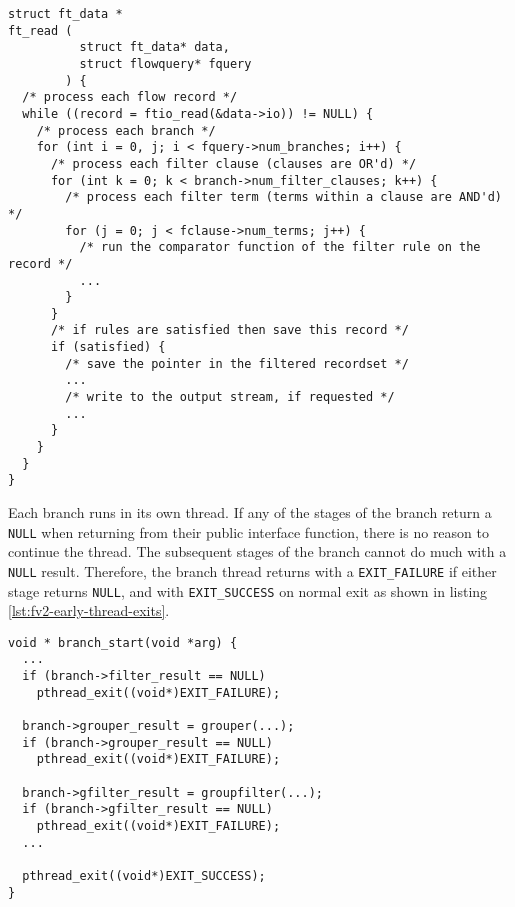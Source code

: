\begin{lstlisting}
struct ft_data *
ft_read (
          struct ft_data* data,
          struct flowquery* fquery
        ) {
  /* process each flow record */
  while ((record = ftio_read(&data->io)) != NULL) {
    /* process each branch */
    for (int i = 0, j; i < fquery->num_branches; i++) {
      /* process each filter clause (clauses are OR'd) */
      for (int k = 0; k < branch->num_filter_clauses; k++) {
        /* process each filter term (terms within a clause are AND'd) */
        for (j = 0; j < fclause->num_terms; j++) {
          /* run the comparator function of the filter rule on the record */
          ...
        }
      }
      /* if rules are satisfied then save this record */
      if (satisfied) {
        /* save the pointer in the filtered recordset */
        ...
        /* write to the output stream, if requested */
        ...
      }
    }
  }
}
\end{lstlisting}




Each branch runs in its own thread. If any of the stages of the branch return
a \texttt{NULL} when returning from their public interface function, there is
no  reason to continue the thread. The
subsequent stages of the branch cannot do much with a \texttt{NULL} result.
Therefore, the branch thread returns with a \texttt{EXIT\_FAILURE} if either
stage returns \texttt{NULL}, and with \texttt{EXIT\_SUCCESS} on normal exit as
shown in listing \ref{lst:fv2-early-thread-exits}.

\begin{lstlisting}
void * branch_start(void *arg) {
  ...
  if (branch->filter_result == NULL)
    pthread_exit((void*)EXIT_FAILURE);

  branch->grouper_result = grouper(...);
  if (branch->grouper_result == NULL)
    pthread_exit((void*)EXIT_FAILURE);

  branch->gfilter_result = groupfilter(...);
  if (branch->gfilter_result == NULL)
    pthread_exit((void*)EXIT_FAILURE);
  ...

  pthread_exit((void*)EXIT_SUCCESS);
}
\end{lstlisting}




